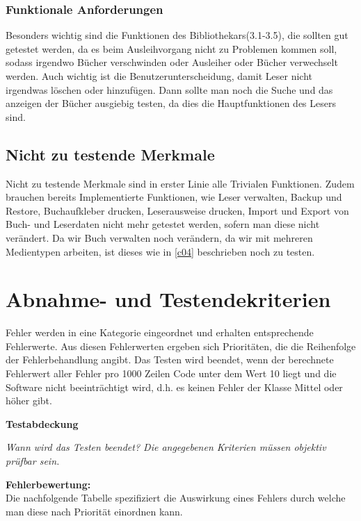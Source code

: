 \documentclass[fontsize=12pt,paper=a4,twoside]{scrartcl}
\begin{document}
\subsubsection{Funktionale Anforderungen} 

Besonders wichtig sind die Funktionen des Bibliothekars(3.1-3.5), die sollten gut getestet werden, da es beim Ausleihvorgang nicht zu Problemen kommen soll, sodass irgendwo Bücher verschwinden oder Ausleiher oder Bücher verwechselt werden. Auch wichtig ist die Benutzerunterscheidung, damit Leser nicht irgendwas löschen oder hinzufügen. Dann sollte man noch die Suche und das anzeigen der Bücher ausgiebig testen, da dies die Hauptfunktionen des Lesers sind.

\subsection{Nicht zu testende Merkmale}\label{c05}
Nicht zu testende Merkmale sind in erster Linie alle Trivialen Funktionen. Zudem brauchen bereits Implementierte Funktionen, wie Leser verwalten, Backup und Restore, Buchaufkleber drucken, Leserausweise drucken, Import und Export von Buch- und Leserdaten nicht mehr getestet werden, sofern man diese nicht verändert. Da wir Buch verwalten noch verändern, da wir mit mehreren Medientypen arbeiten, ist dieses wie in \ref{c04} beschrieben noch zu testen.

\section{Abnahme- und Testendekriterien}\label{c07}
Fehler werden in eine Kategorie eingeordnet und erhalten entsprechende Fehlerwerte. Aus diesen Fehlerwerten ergeben sich Prioritäten, die die Reihenfolge der Fehlerbehandlung angibt. Das Testen wird beendet, wenn der berechnete Fehlerwert aller Fehler pro 1000 Zeilen Code unter dem Wert 10 liegt und die Software nicht beeinträchtigt wird, d.h. es keinen Fehler der Klasse Mittel oder höher gibt.

\textbf{Testabdeckung}

{\em Wann wird das Testen beendet? Die angegebenen Kriterien müssen
  objektiv prüfbar sein.}
  

\textbf{Fehlerbewertung:}\\
Die nachfolgende Tabelle spezifiziert die Auswirkung eines Fehlers durch welche man diese nach Priorität einordnen kann.\\
\end{document}
